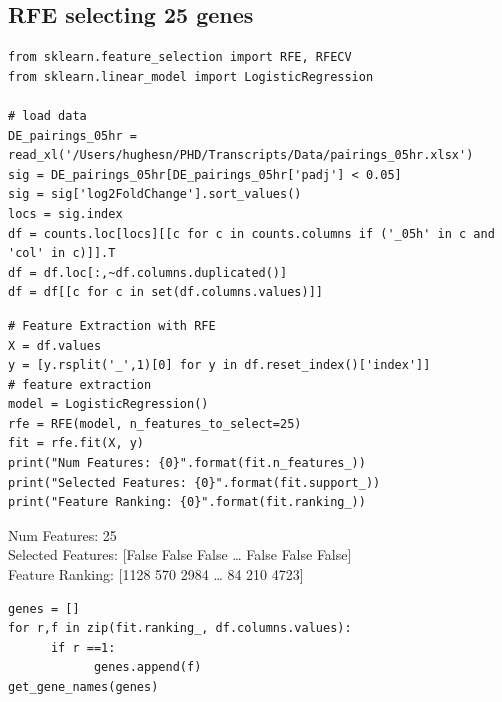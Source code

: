 \documentclass[11pt]{article}
\begin{document}
\subsection{RFE selecting 25 genes}
\label{sec:org96a0218}
\begin{verbatim}
from sklearn.feature_selection import RFE, RFECV
from sklearn.linear_model import LogisticRegression

# load data
DE_pairings_05hr = read_xl('/Users/hughesn/PHD/Transcripts/Data/pairings_05hr.xlsx')
sig = DE_pairings_05hr[DE_pairings_05hr['padj'] < 0.05]
sig = sig['log2FoldChange'].sort_values()
locs = sig.index
df = counts.loc[locs][[c for c in counts.columns if ('_05h' in c and 'col' in c)]].T
df = df.loc[:,~df.columns.duplicated()]
df = df[[c for c in set(df.columns.values)]]
\end{verbatim}

\begin{verbatim}
# Feature Extraction with RFE
X = df.values
y = [y.rsplit('_',1)[0] for y in df.reset_index()['index']]
# feature extraction
model = LogisticRegression()
rfe = RFE(model, n_features_to_select=25)
fit = rfe.fit(X, y)
print("Num Features: {0}".format(fit.n_features_))
print("Selected Features: {0}".format(fit.support_))
print("Feature Ranking: {0}".format(fit.ranking_))
\end{verbatim}

Num Features: 25\\
Selected Features: [False False False \ldots{} False False False]\\
Feature Ranking: [1128  570 2984 \ldots{}   84  210 4723]\\


\begin{verbatim}
genes = []
for r,f in zip(fit.ranking_, df.columns.values):
      if r ==1:
            genes.append(f)
get_gene_names(genes)
\end{verbatim}
\end{document}

